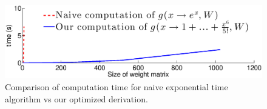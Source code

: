 \begin{figure}[h]
\centering
\includegraphics[scale=0.24]{img/time_approx.eps}
\caption{Comparison of computation time for naive exponential time algorithm vs our optimized derivation.}
\label{time_approx}
\end{figure}



